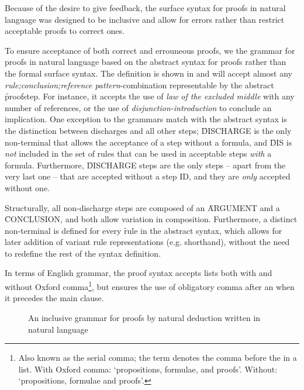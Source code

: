 \documentclass[BA.tex]{subfiles}
\begin{document}
Because of the desire to give feedback, the surface syntax for proofs in
natural language was designed to be inclusive and allow for errors rather
than restrict acceptable proofs to correct ones.

To ensure acceptance of both correct and errouneous proofs, we 
  the grammar for proofs in natural language based on the
 abstract syntax for proofs rather than the formal surface syntax.
 The definition is shown in 
 and will accept almost any 
 \emph{rule;conclusion;reference pattern}-combination representable
 by the abstract \f{proofstep}. For instance, it accepts the use
 of \emph{law of the excluded middle} with any number of references, or
 the use of \emph{disjunction-introduction} to conclude an implication.
 One exception to the grammars match with the abstract syntax is
 the distinction between
 discharges and all other steps; \f{DISCHARGE} is the only non-terminal
 that allows the acceptance of a step without a formula, and \f{DIS} is
 \emph{not} included in the set of rules that can be used in acceptable
 steps \emph{with} a formula. Furthermore, \f{DISCHARGE} steps are the only
 steps -- apart from the very last one -- that are accepted without a step
 ID, and they are \emph{only} accepted without one. 
 
 Structurally, all non-discharge steps are composed of an \f{ARGUMENT} and
 a \f{CONCLUSION}, and both allow variation in composition.
 Furthermore, a distinct non-terminal is defined for every 
 \f{rule} in the abstract syntax, which allows for later addition of
 variant rule representations (e.g. shorthand), without the need to
 redefine the rest of the syntax definition.

 In terms of English grammar, the proof syntax accepts lists both with and
 without Oxford comma\footnote{Also known as the serial comma; the term
 denotes the comma before the  in a list. 
 With Oxford comma: `propositions, formulae, and proofs'. 
 Without: `propositions, formulae and proofs'.},
 but ensures the use of obligatory comma after an 
 when it precedes the main clause. 

\begin{figure}[!ht]
\scriptsize

\caption{An inclusive grammar for proofs by natural deduction written in
natural language}
\label{nlproof}
\end{figure}

\end{document}
